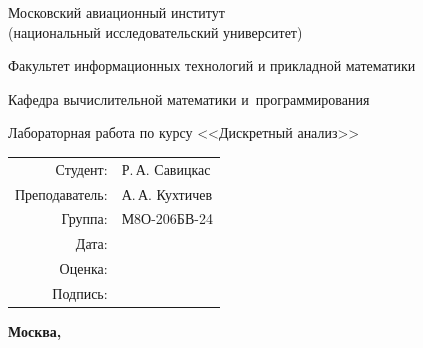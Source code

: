 \begin{titlepage}
    \begin{center}
    \bfseries
    
    {\Large Московский авиационный институт\\ (национальный исследовательский университет)
    
    }
    
    \vspace{48pt}
    
    {\large Факультет информационных технологий и прикладной математики
    }
    
    \vspace{36pt}
    
    {\large Кафедра вычислительной математики и~программирования
    
    }
    
    \vspace{48pt}
    
    Лабораторная работа  по курсу <<Дискретный анализ>>
    
    \end{center}
    
    \vspace{72pt}
    
    \begin{flushright}
    \begin{tabular}{rl}
    Студент: & Р.\,А. Савицкас \\
    Преподаватель: & А.\,А. Кухтичев \\
    Группа: & М8О-206БВ-24 \\
    Дата: & \\
    Оценка: & \\
    Подпись: & \\
    \end{tabular}
    \end{flushright}
    
    \vfill
    
    \begin{center}
    \bfseries
    Москва, \the\year
    \end{center}
    \end{titlepage}
    
    \pagebreak